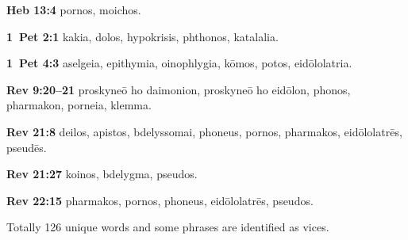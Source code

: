\textbf{Heb 13:4} \gls{pornos}, \gls{moichos}.

\textbf{1~Pet 2:1} \gls{kakia}, \gls{dolos}, \gls{hypokrisis}, \gls{phthonos}, \gls{katalalia}.

\textbf{1~Pet 4:3} \gls{aselgeia}, \gls{epithymia}, \gls{oinophlygia}, \gls{kōmos}, \gls{potos}, \gls{eidōlolatria}.

\textbf{Rev 9:20--21} \gls{proskyneō ho daimonion}, \gls{proskyneō ho eidōlon}, %
\gls{phonos}, \gls{pharmakon}, \gls{porneia}, \gls{klemma}. %

\textbf{Rev 21:8} \gls{deilos}, \gls{apistos}, \gls{bdelyssomai}, \gls{phoneus}, \gls{pornos}, \gls{pharmakos}, \gls{eidōlolatrēs}, \gls{pseudēs}.

\textbf{Rev 21:27} \gls{koinos}, \gls{bdelygma}, \gls{pseudos}.

\textbf{Rev 22:15} \gls{pharmakos}, \gls{pornos}, \gls{phoneus}, \gls{eidōlolatrēs}, \gls{pseudos}.

Totally 126 unique words and some phrases are identified as vices.


